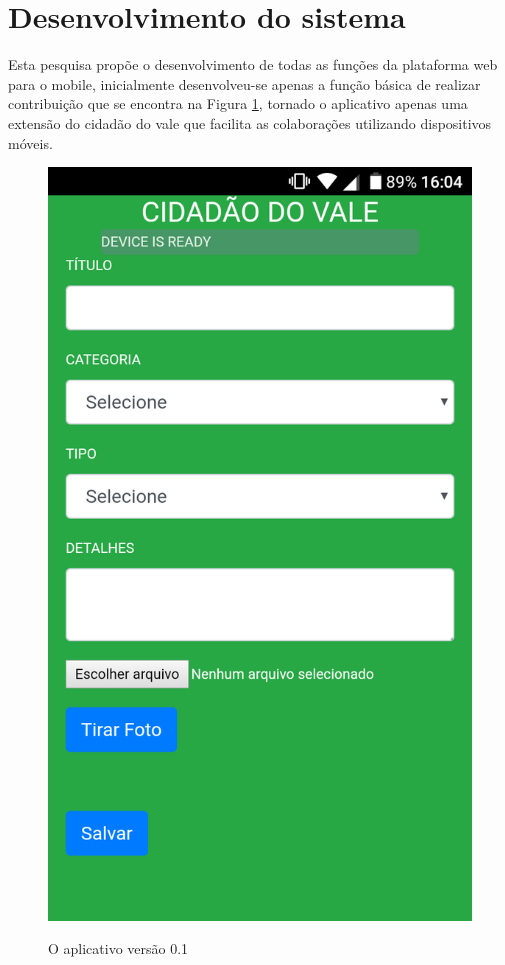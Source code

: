 \section{Desenvolvimento do sistema}
Esta pesquisa propõe o desenvolvimento de todas as funções da plataforma web para o mobile, inicialmente desenvolveu-se apenas a função básica de realizar contribuição que se encontra na Figura \ref{fig:app}, tornado o aplicativo apenas uma extensão do cidadão do vale que facilita as colaborações utilizando dispositivos móveis.

\begin{figure}[H]
    	\centering
    	\caption{O aplicativo versão 0.1}	
    	\includegraphics[width=0.6\linewidth, frame]{Imagens/app0_1.png}
    	\label{fig:app}
\end{figure}
